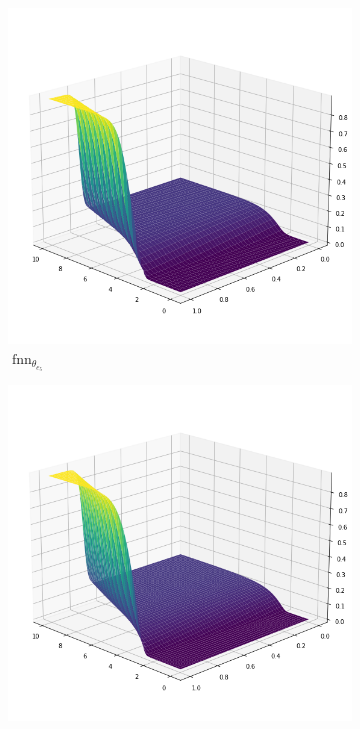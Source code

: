 \begin{figure}[H]
    \begin{center}
        \begin{subfigure}[b]{0.4\textwidth}
            \begin{center}
                \includegraphics[scale=0.35]{img/Kante5.png}
            \end{center}
            \caption{$\operatorname{fnn}_{\theta_{e_5}}$}
        \end{subfigure} \hspace{15mm}
        \begin{subfigure}[b]{0.4\textwidth}
            \begin{center}
                \includegraphics[scale=0.35]{img/FVM5.png}

\end{center}
\end{subfigure}
\end{center}
\end{figure}
